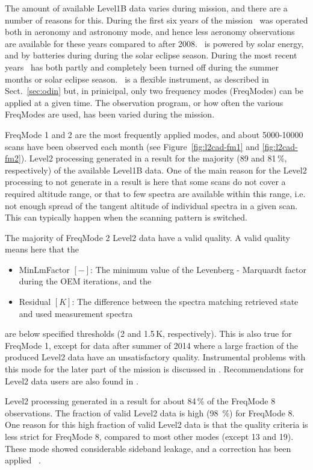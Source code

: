 The amount of available Level1B data varies during mission,
and there are a number of reasons for this.
During the first six years of the mission \smr\ was operated
both in aeronomy and astronomy mode, and hence less
aeronomy observations are available for these years
compared to after 2008. 
\smr\ is powered by solar energy, and by batteries during 
during the solar eclipse season.
During the most recent years \smr\ has both partly and completely
been turned off during the summer months or solar eclipse season.
\smr\ is a flexible instrument, as described in Sect.~\ref{sec:odin}
but, in prinicipal, only two frequency modes (FreqModes)
can be applied at a given time. The observation program, or how
often the various FreqModes are used, has been varied during the
mission.


FreqMode 1 and 2 are the most frequently applied modes, and
about 5000-10000 scans have been observed each month
(see Figure~\ref{fig:l2cad-fm1} and \ref{fig:l2cad-fm2}). Level2 processing
generated in a result for the majority (89 and 81\,\%, respectively) of
the available Level1B data. One of the main reason for the
Level2 processing to not generate in a result
is here that some scans do not cover a required
altitude range, or that to few spectra are available within this range,
i.e. not enough spread of the tangent altitude of individual spectra
in a given scan. This can typically happen when the scanning pattern
is switched.
 
The majority of FreqMode 2 Level2 data have a valid quality.
A valid quality means here that the 
\begin{itemize}

  \item MinLmFactor \([-]\): The minimum value of the Levenberg - Marquardt factor during the OEM iterations, and the

  \item Residual \([K]\):  The difference between the spectra matching retrieved state and
   used measurement spectra

\end{itemize}
are below specified thresholds (2 and 1.5\,K, respectively).
This is also true for FreqMode 1, except for data after summer
of 2014 where a large fraction of the produced Level2 data
have an unsatisfactory quality. Instrumental problems
with this mode for the later part of the mission is discussed
in \cite{pver}. 
Recommendations for Level2 data users are also found in
\cite{pver}.


Level2 processing generated in a result for about 84\,\%
of the FreqMode 8 observations. The fraction of valid Level2
data is high (98 \,\%) for FreqMode 8.
One reason for this high fraction of valid Level2 data
is that the quality criteria is less strict for FreqMode 8,
compared to most other modes (except 13 and 19).
These mode showed considerable sideband leakage, and a correction
has been applied ~\cite{pver}. 


